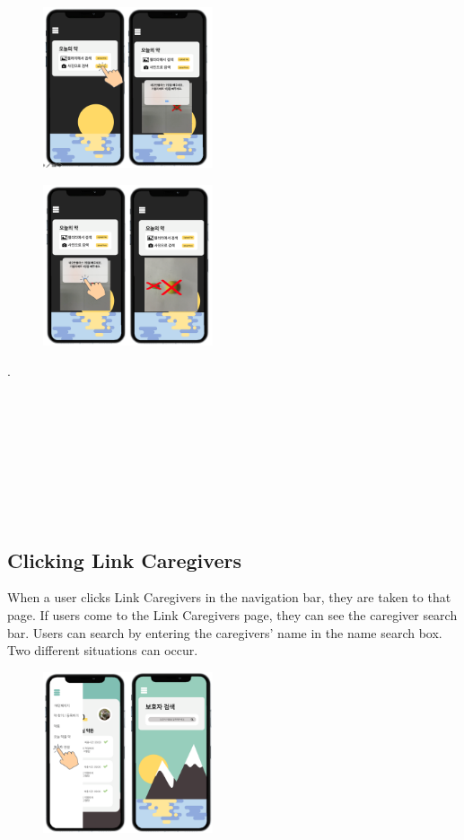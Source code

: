 \documentclass[conference]{IEEEtran}
\begin{document}
\begin{figure}[h!]
\centering
\includegraphics[width=5cm]{final_image_folder/click_today_photo.png}
\caption{}
\label{fig:map}
\end{figure}

\begin{figure}[h!]
\centering
\includegraphics[width=5cm]{final_image_folder/click_today_ok.png}
\caption{}
\label{fig:map}
\end{figure}
.\\
\\
\\
\\
\\
\\
\\
\\
\\

\subsection{Clicking Link Caregivers}
When a user clicks Link Caregivers in the navigation bar, they are taken to that page. If users come to the Link Caregivers page, they can see the caregiver search bar. Users can search by entering the caregivers' name in the name search box. Two different situations can occur.\\

\begin{figure}[h!]
\centering
\includegraphics[width=5cm]{final_image_folder/click_bohoja.png}
\caption{}
\label{fig:map}
\end{figure}
\end{document}
